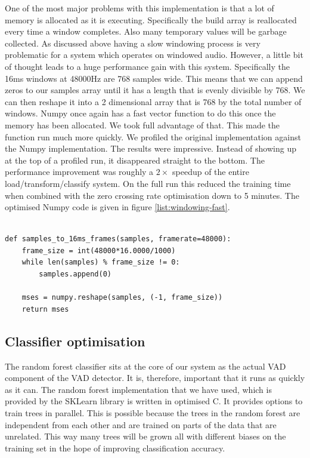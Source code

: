 \documentclass[ %
                    author={Sam Phippen},
                supervisor={Dr. Rafal Bogacz},
                     title={Real time voice activity detectors in noisy personal computing environments},
                  subtitle={},
                    degree={MEng},
                      year={2012} ]{thesis}
\begin{document}
One of the most major problems with this implementation is that a lot of memory
is allocated as it is executing. Specifically the build array is reallocated
every time a window completes. Also many temporary values will be garbage
collected. As discussed above having a slow windowing process is very
problematic for a system which operates on windowed audio. However, a little
bit of thought leads to a huge performance gain with this system. Specifically
the 16ms windows at 48000Hz are 768 samples wide. This means that we can append
zeros to our samples array until it has a length that is evenly divisible by
768. We can then reshape it into a 2 dimensional array that is 768 by the total
number of windows. Numpy once again has a fast vector function to do this once
the memory has been allocated. We took full advantage of that. This made the
function run much more quickly.  We profiled the original implementation
against the Numpy implementation. The results were impressive. Instead of
showing up at the top of a profiled run, it disappeared straight to the bottom.
The performance improvement was roughly a $2\times$ speedup of the entire
load/transform/classify system. On the full run this reduced the training time
when combined with the zero crossing rate optimisation down to 5 minutes. The
optimised Numpy code is given in figure \ref{list:windowing-fast}.

\begin{lstlisting}[frame=single,caption=Optimised windowing implementation, label=list:windowing-fast]

def samples_to_16ms_frames(samples, framerate=48000):
    frame_size = int(48000*16.0000/1000)
    while len(samples) % frame_size != 0:
        samples.append(0)

    mses = numpy.reshape(samples, (-1, frame_size))
    return mses

\end{lstlisting}

\subsection{Classifier optimisation}

The random forest classifier sits at the core of our system as the actual VAD
component of the VAD detector. It is, therefore, important that it runs as
quickly as it can. The random forest implementation that we have used, which is
provided by the SKLearn library is written in optimised C. It provides options
to train trees in parallel. This is possible because the trees in the random
forest are independent from each other and are trained on parts of the data
that are unrelated. This way many trees will be grown all with different biases
on the training set in the hope of improving classification accuracy.
\end{document}
